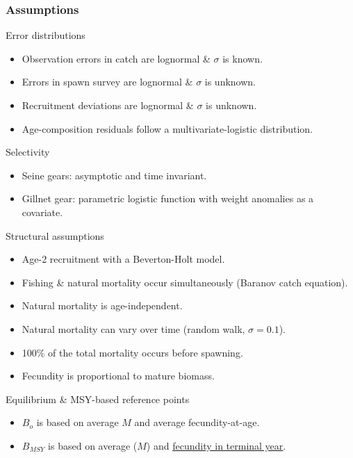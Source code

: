 \begin{frame}[t,allowframebreaks]\frametitle{Assumptions}
	\begin{block}
		{Error distributions}
		\begin{itemize}
			\item Observation errors in catch are lognormal \& $\sigma$ is known.
			\item Errors in spawn survey are lognormal \& $\sigma$ is unknown.
			\item Recruitment deviations are lognormal \& $\sigma$ is unknown.
			\item Age-composition residuals follow a multivariate-logistic distribution.
		\end{itemize}
	\end{block}
	
	\begin{block}
		{Selectivity}
		\begin{itemize}
			\item Seine gears: asymptotic and time invariant.
			\item Gillnet gear: parametric logistic function with weight anomalies as a covariate. 
		\end{itemize}
	\end{block}
	
	\framebreak
	\begin{block}
		{Structural assumptions}
		\begin{itemize}
			\item Age-2 recruitment with a Beverton-Holt model.
			\item Fishing \& natural mortality occur simultaneously (Baranov catch equation).
			\item Natural mortality is age-independent.
			\item Natural mortality can vary over time (random walk, $\sigma=0.1$).
			\item 100\% of the total mortality occurs before spawning.
			\item Fecundity is proportional to mature biomass.
		\end{itemize}
	\end{block}
	
	\begin{block}
		{Equilibrium \& MSY-based reference points}
		\begin{itemize}
			\item $B_o$ is based on average $M$ and average fecundity-at-age.
			\item $B_{MSY}$ is based on average ($M$) and \underline{fecundity in terminal year}.
		\end{itemize}
	\end{block}
	
\end{frame}

